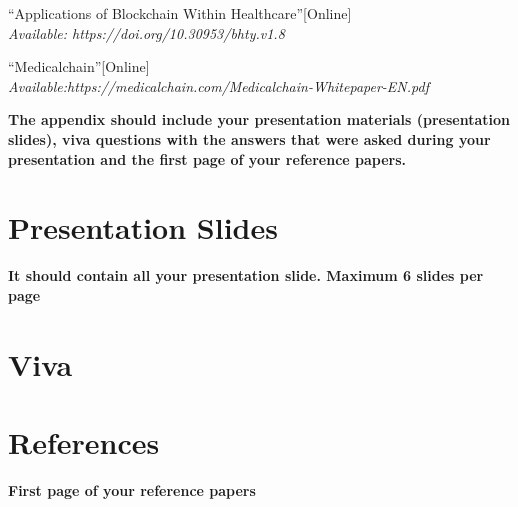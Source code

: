 \documentclass[12pt]{report}
\begin{document}
\begin{thebibliography}{100}
 \textquotedblleft Applications of Blockchain Within Healthcare\textquotedblright[Online]\\ 
\textit{Available: https://doi.org/10.30953/bhty.v1.8}


 \textquotedblleft Medicalchain\textquotedblright[Online]\\ 
\textit{Available:https://medicalchain.com/Medicalchain-Whitepaper-EN.pdf}


\vspace{2cm}

\end{thebibliography}

\begin{appendices}
\textbf{The appendix should include your presentation materials (presentation slides), viva questions with the answers that were asked during your presentation and the first page of your reference papers.}
\chapter*{Presentation Slides}
\textbf{It should contain all your presentation slide. Maximum 6 slides per page}
\chapter*{Viva }
\chapter*{References}
\textbf{First page of your reference papers}

\end{appendices}
\end{document}
